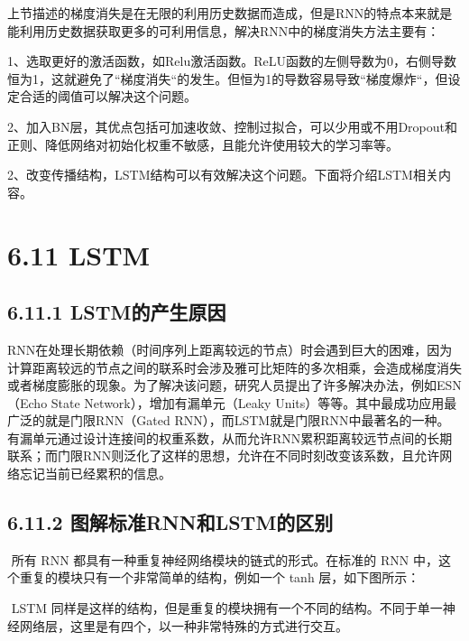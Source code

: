 ​
上节描述的梯度消失是在无限的利用历史数据而造成，但是RNN的特点本来就是能利用历史数据获取更多的可利用信息，解决RNN中的梯度消失方法主要有：

​
1、选取更好的激活函数，如Relu激活函数。ReLU函数的左侧导数为0，右侧导数恒为1，这就避免了``梯度消失``的发生。但恒为1的导数容易导致``梯度爆炸``，但设定合适的阈值可以解决这个问题。

​
2、加入BN层，其优点包括可加速收敛、控制过拟合，可以少用或不用Dropout和正则、降低网络对初始化权重不敏感，且能允许使用较大的学习率等。

​
2、改变传播结构，LSTM结构可以有效解决这个问题。下面将介绍LSTM相关内容。

\section{6.11 LSTM}\label{lstm}

\subsection{6.11.1
LSTM的产生原因}\label{lstmux7684ux4ea7ux751fux539fux56e0}

​
RNN在处理长期依赖（时间序列上距离较远的节点）时会遇到巨大的困难，因为计算距离较远的节点之间的联系时会涉及雅可比矩阵的多次相乘，会造成梯度消失或者梯度膨胀的现象。为了解决该问题，研究人员提出了许多解决办法，例如ESN（Echo
State Network），增加有漏单元（Leaky
Units）等等。其中最成功应用最广泛的就是门限RNN（Gated
RNN），而LSTM就是门限RNN中最著名的一种。有漏单元通过设计连接间的权重系数，从而允许RNN累积距离较远节点间的长期联系；而门限RNN则泛化了这样的思想，允许在不同时刻改变该系数，且允许网络忘记当前已经累积的信息。

\subsection{6.11.2
图解标准RNN和LSTM的区别}\label{ux56feux89e3ux6807ux51c6rnnux548clstmux7684ux533aux522b}

​ 所有 RNN 都具有一种重复神经网络模块的链式的形式。在标准的 RNN
中，这个重复的模块只有一个非常简单的结构，例如一个 tanh 层，如下图所示：


​ LSTM
同样是这样的结构，但是重复的模块拥有一个不同的结构。不同于单一神经网络层，这里是有四个，以一种非常特殊的方式进行交互。

